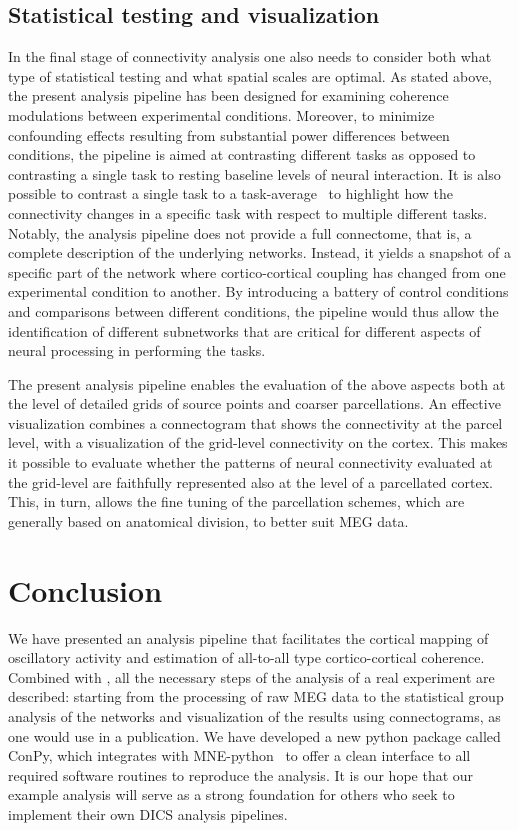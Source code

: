 \documentclass[utf8]{frontiersSCNS}
\renewcommand{\cite}[1]{~\citep{#1}}
\newcommand{\textcite}[1]{\citet{#1}}
\begin{document}
\subsection{Statistical testing and visualization}

In the final stage of connectivity analysis one also needs to consider both what type of statistical testing and what spatial scales are optimal.
As stated above, the present analysis pipeline has been designed for examining coherence modulations between experimental conditions.
Moreover, to minimize confounding effects resulting from substantial power differences between conditions, the pipeline is aimed at contrasting different tasks as opposed to contrasting a single task to resting baseline levels of neural interaction.
It is also possible to contrast a single task to a task-average\cite{Saarinen2015} to highlight how the connectivity changes in a specific task with respect to multiple different tasks.
Notably, the analysis pipeline does not provide a full connectome, that is, a complete description of the underlying networks.
Instead, it yields a snapshot of a specific part of the network where cortico-cortical coupling has changed from one experimental condition to another.
By introducing a battery of control conditions and comparisons between different conditions, the pipeline would thus allow the identification of different subnetworks that are critical for different aspects of neural processing in performing the tasks.

The present analysis pipeline enables the evaluation of the above aspects both at the level of detailed grids of source points and coarser parcellations.
An effective visualization combines a connectogram that shows the connectivity at the parcel level, with a visualization of the grid-level connectivity on the cortex.
This makes it possible to evaluate whether the patterns of neural connectivity evaluated at the grid-level are faithfully represented also at the level of a parcellated cortex.
This, in turn, allows the fine tuning of the parcellation schemes, which are generally based on anatomical division, to better suit MEG data.


\section{Conclusion}

We have presented an analysis pipeline that facilitates the cortical mapping of oscillatory activity and estimation of all-to-all type cortico-cortical coherence.
Combined with \textcite{Jas2017}, all the necessary steps of the analysis of a real experiment are described: starting from the processing of raw MEG data to the statistical group analysis of the networks and visualization of the results using connectograms, as one would use in a publication.
We have developed a new python package called ConPy, which integrates with MNE-python\cite{mne} to offer a clean interface to all required software routines to reproduce the analysis.
It is our hope that our example analysis will serve as a strong foundation for others who seek to implement their own DICS analysis pipelines.
\end{document}
